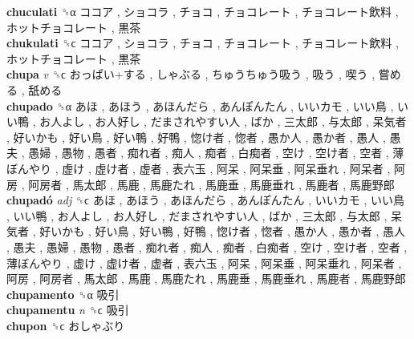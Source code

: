\textbf{chuculati} ␝α   ココア ,  ショコラ ,  チョコ ,  チョコレート ,  チョコレート飲料 ,  ホットチョコレート ,  黒茶   \\
\textbf{chukulati} ␝ϲ   ココア ,  ショコラ ,  チョコ ,  チョコレート ,  チョコレート飲料 ,  ホットチョコレート ,  黒茶   \\
\textbf{chupa} \emph{v}  ␝ϲ   おっぱい+する ,  しゃぶる ,  ちゅうちゅう吸う ,  吸う ,  喫う ,  嘗める ,  舐める   \\
\textbf{chupado} ␝α   あほ ,  あほう ,  あほんだら ,  あんぽんたん ,  いいカモ ,  いい鳥 ,  いい鴨 ,  お人よし ,  お人好し ,  だまされやすい人 ,  ばか ,  三太郎 ,  与太郎 ,  呆気者 ,  好いかも ,  好い鳥 ,  好い鴨 ,  好鴨 ,  惚け者 ,  惚者 ,  愚か人 ,  愚か者 ,  愚人 ,  愚夫 ,  愚婦 ,  愚物 ,  愚者 ,  痴れ者 ,  痴人 ,  痴者 ,  白痴者 ,  空け ,  空け者 ,  空者 ,  薄ぼんやり ,  虚け ,  虚け者 ,  虚者 ,  表六玉 ,  阿呆 ,  阿呆垂 ,  阿呆垂れ ,  阿呆者 ,  阿房 ,  阿房者 ,  馬太郎 ,  馬鹿 ,  馬鹿たれ ,  馬鹿垂 ,  馬鹿垂れ ,  馬鹿者 ,  馬鹿野郎   \\
\textbf{chupadó} \emph{adj}  ␝ϲ   あほ ,  あほう ,  あほんだら ,  あんぽんたん ,  いいカモ ,  いい鳥 ,  いい鴨 ,  お人よし ,  お人好し ,  だまされやすい人 ,  ばか ,  三太郎 ,  与太郎 ,  呆気者 ,  好いかも ,  好い鳥 ,  好い鴨 ,  好鴨 ,  惚け者 ,  惚者 ,  愚か人 ,  愚か者 ,  愚人 ,  愚夫 ,  愚婦 ,  愚物 ,  愚者 ,  痴れ者 ,  痴人 ,  痴者 ,  白痴者 ,  空け ,  空け者 ,  空者 ,  薄ぼんやり ,  虚け ,  虚け者 ,  虚者 ,  表六玉 ,  阿呆 ,  阿呆垂 ,  阿呆垂れ ,  阿呆者 ,  阿房 ,  阿房者 ,  馬太郎 ,  馬鹿 ,  馬鹿たれ ,  馬鹿垂 ,  馬鹿垂れ ,  馬鹿者 ,  馬鹿野郎   \\
\textbf{chupamento} ␝α   吸引   \\
\textbf{chupamentu} \emph{n}  ␝ϲ   吸引   \\
\textbf{chupon} ␝ϲ   おしゃぶり   \\
